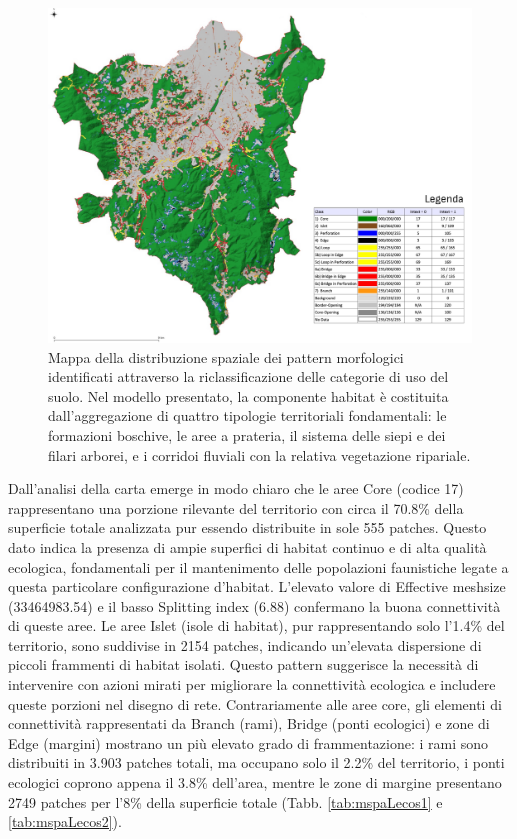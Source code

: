 \documentclass[
]{book}
\begin{document}
\begin{figure}

{\centering \includegraphics[width=\linewidth]{./figs/mspa8211_relazione} 

}

\caption{Mappa della distribuzione spaziale dei pattern morfologici identificati attraverso la riclassificazione delle categorie di uso del suolo. Nel modello presentato, la componente habitat è  costituita dall'aggregazione di quattro tipologie territoriali fondamentali: le formazioni boschive, le aree a prateria, il sistema delle siepi e dei filari arborei, e i corridoi fluviali con la relativa vegetazione ripariale.}\label{fig:mspaAll}
\end{figure}

Dall'analisi della carta emerge in modo chiaro che le aree Core (codice 17) rappresentano una porzione rilevante del territorio con circa il 70.8\% della superficie totale analizzata pur essendo distribuite in sole 555 patches.
Questo dato indica la presenza di ampie superfici di habitat continuo e di alta qualità ecologica, fondamentali per il mantenimento delle popolazioni faunistiche legate a questa particolare configurazione d'habitat.
L'elevato valore di Effective meshsize (33464983.54) e il basso Splitting index (6.88) confermano la buona connettività di queste aree.
Le aree Islet (isole di habitat), pur rappresentando solo l'1.4\% del territorio, sono suddivise in 2154 patches, indicando un'elevata dispersione di piccoli frammenti di habitat isolati.
Questo pattern suggerisce la necessità di intervenire con azioni mirati per migliorare la connettività ecologica e includere queste porzioni nel disegno di rete.
Contrariamente alle aree core, gli elementi di connettività rappresentati da Branch (rami), Bridge (ponti ecologici) e zone di Edge (margini) mostrano un più elevato grado di frammentazione: i rami sono distribuiti in 3.903 patches totali, ma occupano solo il 2.2\% del territorio, i ponti ecologici coprono appena il 3.8\% dell'area, mentre le zone di margine presentano 2749 patches per l'8\% della superficie totale (Tabb. \ref{tab:mspaLecos1} e \ref{tab:mspaLecos2}).
\end{document}
